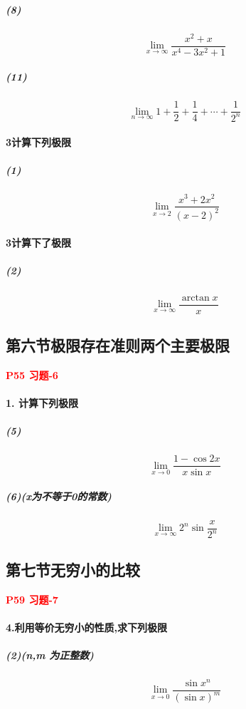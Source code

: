 \documentclass[a4paper]{article}
\begin{document}
\subparagraph{(8)}
$$
\lim_{x \rightarrow \infty}
     {
         \frac
         {
             x^2 + x
         }
         {
             x^4 - 3x^2 + 1
         }
     }
$$

\subparagraph{(11)}
$$
\lim_{n \rightarrow \infty}
    {
        1 + \frac{1}{2} + \frac{1}{4} + \cdots + \frac{1}{2^n}
    }
$$

\paragraph{3\quad 计算下列极限}
\subparagraph{(1)}
$$
\lim_{x \rightarrow 2}
     {
         \frac{x^3 + 2x^2}
              {(x-2)^2}
     }
$$

\paragraph{3\quad 计算下了极限}
\subparagraph{(2)}
$$
\lim_{x \rightarrow \infty }
     {
         \frac{ \arctan{x} } {x}
     }
$$

\subsection{第六节\quad 极限存在准则\quad 两个主要极限}
\textcolor{red}{\textbf{P55 \quad 习题-6}}

\paragraph{1. 计算下列极限}
\subparagraph{(5)}
$$
\lim_{x \rightarrow 0}
     {
         \frac{1 - \cos{2x}} 
              {x \sin{x}}
     }
$$

\subparagraph{(6)(x为不等于0的常数)}
$$
\lim_{x \rightarrow \infty}
     {
         2^n \sin{\frac{x}{2^n} }
     }
$$


\subsection{第七节\quad 无穷小的比较}
\textcolor{red}{\textbf{P59 \quad 习题-7}}

\paragraph{4.利用等价无穷小的性质,求下列极限}
\subparagraph{(2)(n,m 为正整数)}
$$
\lim_{x \rightarrow 0}
     {
         \frac{\sin{x^n}}
              {(\sin{x})^m}
     }
$$ 
\end{document}
